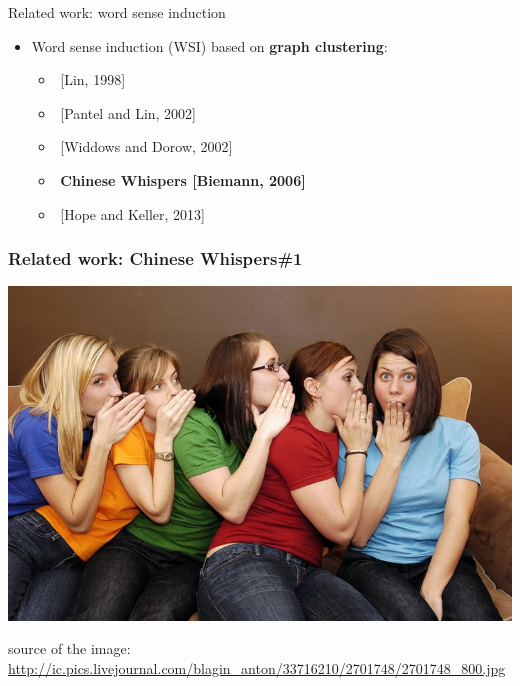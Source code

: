 \documentclass{beamer}
\begin{document}
\begin{frame}{Related work: word sense induction}

\begin{itemize}
	\item Word sense induction (WSI) based on \alert{\textbf{graph clustering}}:  
	\begin{itemize}
	\item $ $ [Lin, 1998]
	\item $ $ [Pantel and Lin, 2002]
	\item $ $ [Widdows and Dorow, 2002]
	\item $ $ \textbf{Chinese Whispers [Biemann, 2006]}
	\item $ $ [Hope and Keller, 2013]
	\end{itemize}
	
\end{itemize}
	

\end{frame}



\begin{frame}[fragile]
\frametitle{Related work: Chinese Whispers\#1}
\begin{center}
 \includegraphics[height=0.5\textwidth]{cw}
 
  {\tiny * source of the image: \url{http://ic.pics.livejournal.com/blagin_anton/33716210/2701748/2701748_800.jpg}}
 \end{center}
\end{frame}
\end{document}
